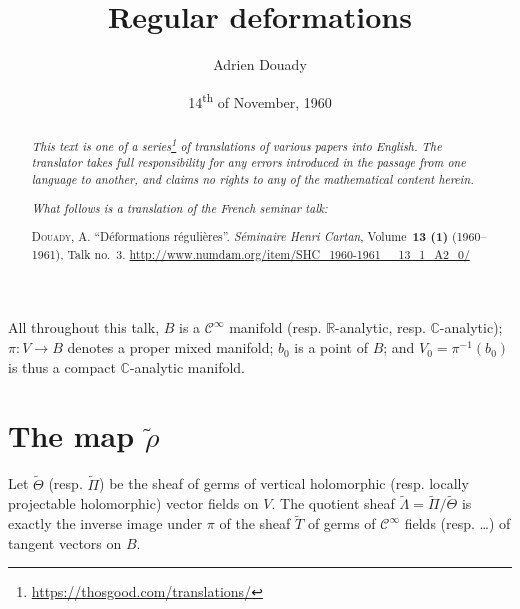 \documentclass{article}
\title{Regular deformations}
\author{Adrien Douady}
\date{14\textsuperscript{th} of November, 1960}
\theoremstyle{plain}
\theoremstyle{definition}
\newcommand{\RR}{\mathbb{R}}
\newcommand{\CC}{\mathbb{C}}
\newcommand{\oldpage}[1]{\marginpar{\footnotesize$\Big\vert$ \textit{p.~#1}}}
\begin{document}
\maketitle
\thispagestyle{fancy}

\renewcommand{\abstractname}{Translator's note.}

\begin{abstract}
  \renewcommand*{\thefootnote}{\fnsymbol{footnote}}
  \emph{This text is one of a series\footnote{\url{https://thosgood.com/translations/}} of translations of various papers into English.}
  \emph{The translator takes full responsibility for any errors introduced in the passage from one language to another, and claims no rights to any of the mathematical content herein.}

  \medskip
  
  \emph{What follows is a translation of the French seminar talk:}

  \medskip\noindent
  \textsc{Douady, A.}
  ``D\'{e}formations r\'{e}guli\`{e}res''.
  \emph{S\'{e}minaire Henri Cartan}, Volume~\textbf{13 (1)} (1960--1961), Talk no.~3.
  {\url{http://www.numdam.org/item/SHC_1960-1961__13_1_A2_0/}}
\end{abstract}

\setcounter{footnote}{0}

\tableofcontents
\bigskip



\oldpage{3-01}
All throughout this talk, $B$ is a $\mathscr{C}^\infty$ manifold (resp. $\RR$-analytic, resp. $\CC$-analytic); $\pi\colon V\to B$ denotes a proper mixed manifold; $b_0$ is a point of $B$; and $V_0=\pi^{-1}(b_0)$ is thus a compact $\CC$-analytic manifold.


\section{The map \texorpdfstring{$\widetilde{\rho}$}{p}}
\label{I}

Let $\widetilde{\Theta}$ (resp. $\widetilde{\Pi}$) be the sheaf of germs of vertical holomorphic (resp. locally projectable holomorphic) vector fields on $V$.
The quotient sheaf $\widetilde{\Lambda}=\widetilde{\Pi}/\widetilde{\Theta}$ is exactly the inverse image under $\pi$ of the sheaf $\widetilde{T}$ of germs of $\mathscr{C}^\infty$ fields (resp. \ldots) of tangent vectors on $B$.
\end{document}
